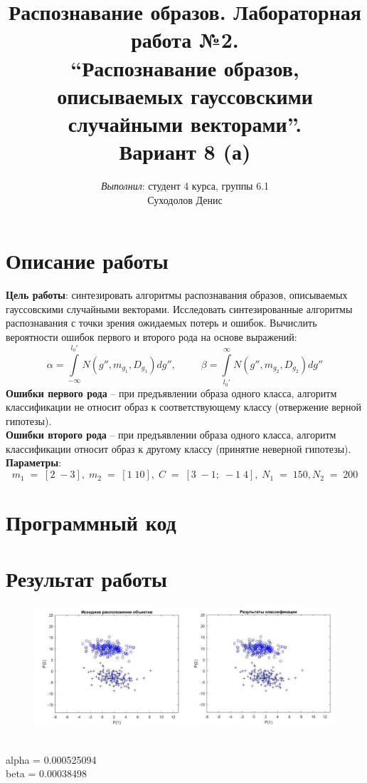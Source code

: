 \documentclass[12pt]{article} %
\begin{document}

\title{{\large Распознавание образов. Лабораторная работа №2.} \\
	\textbf{\textquotedblleft Распознавание образов, описываемых гауссовскими случайными
	векторами\textquotedblright}.\\
	{\large Вариант 8 (а)}}
\date{}
\author{\textit{Выполнил}: студент 4 курса, группы 6.1 \\
	Суходолов Денис}
        
\maketitle

\begin{spacing}{1} %
\section*{Описание работы}
\textbf{Цель работы}: синтезировать алгоритмы распознавания образов,
описываемых  гауссовскими  случайными  векторами.  Исследовать
синтезированные алгоритмы распознавания с точки зрения ожидаемых потерь
и ошибок. Вычислить вероятности ошибок первого и второго рода на основе
выражений:
$$\alpha = \int\limits_{-\infty}^{l_0'}N(g'', m_{g_1},D_{g_1})dg'', \;\;\;\;\;\;\;\;\; \beta = \int\limits^{\infty}_{l_0'}N(g'', m_{g_2},D_{g_2})dg'' $$
\textbf{Ошибки первого рода} – при предъявлении образа одного класса, алгоритм классификации не относит образ к соответствующему классу (отвержение верной гипотезы).
~\\
\textbf{Ошибки второго рода}  – при предъявлении образа одного класса, алгоритм классификации относит образ к другому классу (принятие неверной гипотезы).
~\\
\textbf{Параметры}:
$$m_1\;=\;[2\;-3],\;m_2\;=\;[1\;10],\;C\;=\;[3\;-1;\;-1\;4],\;N_1\;=\;150, N_2\;=\;200$$
\section*{Программный код}
 
\section*{Результат работы}
\begin{figure}[h]
	\begin{center}
		\includegraphics[width = 18cm]{1.jpg}
	\end{center}
\end{figure}
~\\
{\ttfamily\footnotesize 
alpha = 0.000525094 
~\\
beta = 0.00038498 }




\end{spacing}
\end{document}
